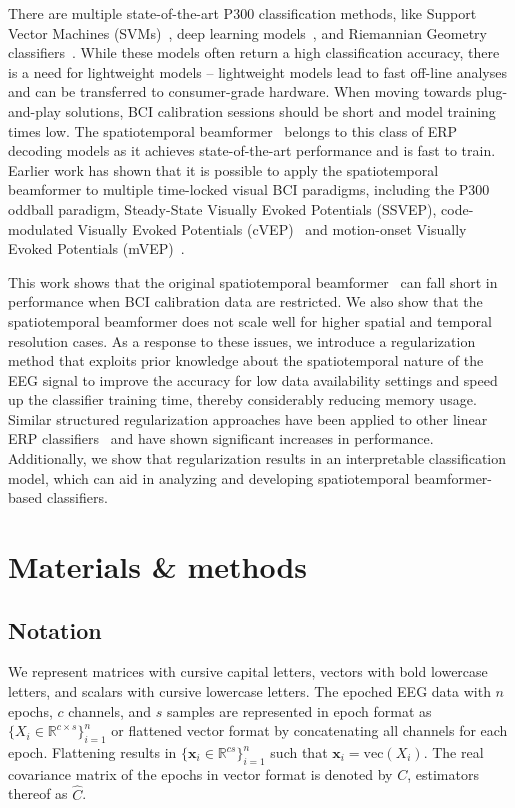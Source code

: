 	There are multiple state-of-the-art P300 classification methods, like Support
	Vector Machines (SVMs)~\cite{Tayeb2014}, deep
	learning models~\cite{Vareka2020,Borra2020}, and Riemannian Geometry
	classifiers~\cite{Barachant2014}.
	While these models often return a high classification accuracy, there is a need
	for lightweight models -- lightweight models lead to fast off-line analyses and can be transferred to consumer-grade hardware.
	When moving towards plug-and-play solutions, BCI calibration sessions should be short and model training times low.
	The spatiotemporal beamformer~\cite{VanVliet2015, Wittevrongel2016} belongs to
	this class of ERP decoding models as it achieves state-of-the-art performance and is fast to train.
	Earlier work has shown that it is
	possible to apply the spatiotemporal beamformer to multiple time-locked visual
	BCI paradigms, including the P300 oddball paradigm,
	Steady-State Visually Evoked Potentials (SSVEP), code-modulated Visually Evoked Potentials (cVEP)~\cite{Wittevrongel2017a} and
	motion-onset Visually Evoked Potentials (mVEP)~\cite{Libert2021}.

	This work shows that the original spatiotemporal
	beamformer~\cite{Wittevrongel2016} can fall short in performance when BCI
	calibration data are restricted.
	We also show that the spatiotemporal beamformer does not scale well for
	higher spatial and temporal resolution cases.
	As a response to these issues, we introduce a regularization method that
	exploits prior knowledge about the spatiotemporal nature of the EEG signal to
	improve the accuracy for low data availability settings and speed up the
	classifier training time, thereby considerably reducing memory usage.
	Similar structured regularization approaches have been applied to other linear
	ERP classifiers~\cite{GonzalezNavarro2017, Vliet2020} and have shown
	significant increases in performance.
	Additionally, we show that regularization results in an interpretable
	classification model, which can aid in analyzing and developing spatiotemporal beamformer-based classifiers.

	\section{Materials \& methods}
	\subsection{Notation}
	We represent matrices with cursive capital letters, vectors with bold
	lowercase letters, and scalars with cursive lowercase letters.
	The epoched EEG data with $n$ epochs, $c$ channels, and $s$ samples are
	represented in epoch format as $\{X_i\in\mathbb{R}^{c\times s}\}^n_{i=1}$ or flattened vector format by concatenating all channels for each epoch.
	Flattening results in $\{\mathbf{x}_i\in\mathbb{R}^{cs}\}^n_{i=1}$ such that $\mathbf{x}_i = \text{vec}(X_i)$.
	The real covariance matrix of the epochs in vector format is
	denoted by $C$, estimators thereof as $\hat{C}$.

